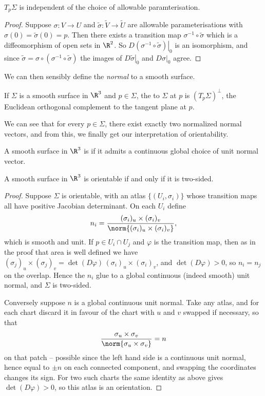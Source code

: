 \begin{lemma}
$T_p\Sigma$ is independent of the choice of allowable paramterisation.
\end{lemma}
\begin{proof}
    Suppose $\sigma: V \rightarrow U$ and $\tilde \sigma : \tilde V \rightarrow \tilde U$ are allowable parameterisations with $\sigma(0) = \tilde \sigma(0) = p$. Then there exists a transition map $\sigma^{-1} \circ \tilde \sigma$ which is a diffeomorphism of open sets in $\R^2$. So $D\left.(\sigma^{-1} \circ \tilde \sigma) \right|_0$ is an isomorphism, and since $\tilde \sigma = \sigma \circ (\sigma^{-1} \circ \tilde \sigma)$ the images of $\left.D \tilde\sigma\right|_0$ and $\left.D \sigma\right|_0$ agree.
\end{proof}

We can then sensibly define the \emph{normal} to a smooth surface.

\begin{definition}
    If $\Sigma$ is a smooth surface in $\R^3$ and $p \in \Sigma$, the  to $\Sigma$ at $p$ is $(T_p \Sigma)^\perp$, the Euclidean orthogonal complement to the tangent plane at $p$.
\end{definition}

We can see that for every $p \in \Sigma$, there exist exactly two normalized normal vectors, and from this, we finally get our interpretation of orientability.

\begin{definition}
    A smooth surface in $\R^3$ is  if it admits a continuous global choice of unit normal vector.
\end{definition}

\begin{lemma}
    A smooth surface in $\R^3$ is orientable if and only if it is two-sided.
\end{lemma}
\begin{proof}
    Suppose $\Sigma$ is orientable, with an atlas $\{(U_i, \sigma_i)\}$ whose transition maps all have positive Jacobian determinant. On each $U_i$ define
    $$
    n_i = \frac{(\sigma_i)_u \times (\sigma_i)_v}{\norm{(\sigma_i)_u \times (\sigma_i)_v}},
    $$
    which is smooth and unit. If $p \in U_i \cap U_j$ and $\varphi$ is the transition map, then as in the proof that area is well defined we have $(\sigma_j)_u \times (\sigma_j)_v = \det(D\varphi)\,(\sigma_i)_u\times(\sigma_i)_v$, and $\det(D\varphi) > 0$, so $n_i = n_j$ on the overlap. Hence the $n_i$ glue to a global continuous (indeed smooth) unit normal, and $\Sigma$ is two-sided.

    Conversely suppose $n$ is a global continuous unit normal. Take any atlas, and for each chart discard it in favour of the chart with $u$ and $v$ swapped if necessary, so that
    $$
    \frac{\sigma_u\times\sigma_v}{\norm{\sigma_u\times\sigma_v}} = n
    $$
    on that patch -- possible since the left hand side is a continuous unit normal, hence equal to $\pm n$ on each connected component, and swapping the coordinates changes its sign. For two such charts the same identity as above gives $\det(D\varphi) > 0$, so this atlas is an orientation.
\end{proof}

